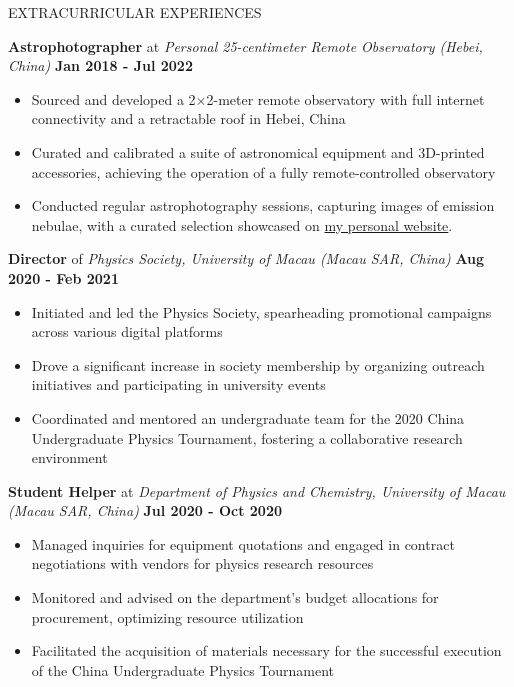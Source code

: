 \documentclass[10pt]{article} %
\begin{document}
\begin{section}{EXTRACURRICULAR EXPERIENCES}

\textbf{Astrophotographer} at \textit{Personal 25-centimeter Remote Observatory (Hebei, China)} \hfill \textbf{Jan 2018 - Jul 2022} 
\begin{itemize}[leftmargin=1.5em]
    \item Sourced and developed a 2$\times$2-meter remote observatory with full internet connectivity and a retractable roof in Hebei, China
    \item Curated and calibrated a suite of astronomical equipment and 3D-printed accessories, achieving the operation of a fully remote-controlled observatory
    \item Conducted regular astrophotography sessions, capturing images of emission nebulae, with a curated selection showcased on \href{https://yliu.fit/astrophotography/}{my personal website}. 
\end{itemize}

\textbf{Director} of \textit{Physics Society, University of Macau (Macau SAR, China)} \hfill \textbf{Aug 2020 - Feb 2021} 
\begin{itemize}[leftmargin=1.5em]
    \item Initiated and led the Physics Society, spearheading promotional campaigns across various digital platforms
    \item Drove a significant increase in society membership by organizing outreach initiatives and participating in university events
    \item Coordinated and mentored an undergraduate team for the 2020 China Undergraduate Physics Tournament, fostering a collaborative research environment
\end{itemize}

\textbf{Student Helper} at \textit{Department of Physics and Chemistry, University of Macau (Macau SAR, China)} \hfill \textbf{Jul 2020 - Oct 2020} 
\begin{itemize}[leftmargin=1.5em]
    \item Managed inquiries for equipment quotations and engaged in contract negotiations with vendors for physics research resources
    \item Monitored and advised on the department’s budget allocations for procurement, optimizing resource utilization
    \item Facilitated the acquisition of materials necessary for the successful execution of the China Undergraduate Physics Tournament
\end{itemize}


\end{section}
\end{document}
